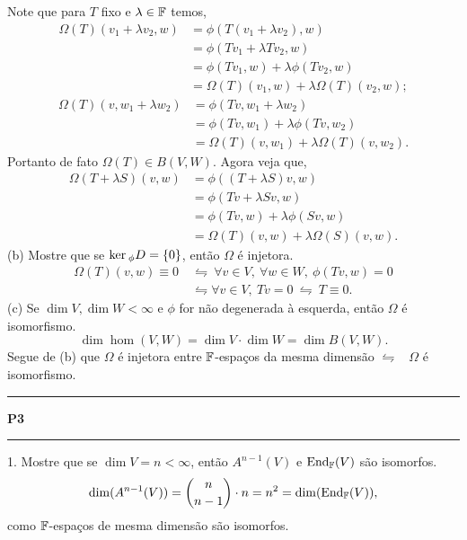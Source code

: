 \textcolor{gris}{Note que para \(T\) fixo e \(\lambda \in \mathbb{F}\) temos, 
\begin{align*}
  \Omega(T)(v_1 + \lambda v_2,w) &= \phi(T(v_1+\lambda v_2), w) \\ 
  &= \phi(Tv_1 + \lambda Tv_2, w )\\ 
  &= \phi(Tv_1, w ) + \lambda\phi(Tv_2, w)\\ 
  &= \Omega(T)(v_1,w) + \lambda \Omega(T)(v_2, w );
\end{align*}
\vspace{-0.8cm}
\begin{align*}
  \Omega(T)(v, w_1 + \lambda w_2) &= \phi(Tv, w_1+\lambda w_2) \\ 
  &= \phi(Tv,w_1) + \lambda \phi(Tv, w_2)\\ 
  &= \Omega(T)(v,w_1) + \lambda \Omega(T)(v, w_2 ).
\end{align*}
Portanto de fato \(\Omega(T) \in B(V,W)\). Agora veja que, 
\begin{align*}
  \Omega(T+ \lambda S)(v,w) &= \phi((T+\lambda S)v, w) \\ 
   &= \phi(Tv+\lambda Sv, w) \\ 
   &= \phi(Tv,w)+\lambda \phi(Sv, w) \\ 
   &= \Omega(T)(v,w)+\lambda \Omega(S)(v, w).  
\end{align*}
}
(b) Mostre que se \(\ker\hspace{0.01cm} _\phi D = \{0\}\), então \(\Omega\) é injetora. 
\textcolor{gris}{
\begin{align*}
  \Omega(T)(v,w) \equiv 0 \ &\leftrightharpoons \ \forall v \in V, \ \forall w \in W, \ \phi(Tv, w) = 0\\ 
  &\leftrightharpoons \forall v\in V, \ Tv = 0 \ \leftrightharpoons \ T\equiv 0. 
\end{align*}
}
(c) Se \(\dim V, \dim W < \infty\) e \(\phi\) for não degenerada à esquerda, então \(\Omega\) é isomorfismo. \\
\textcolor{gris}{
\[\dim \hom(V,W) = \dim V \cdot \dim W = \dim B(V,W).\]  
Segue de (b) que \(\Omega\) é injetora entre \(\mathbb{F}\)-espaços da mesma dimensão \(\leftrightharpoons\) \ \(\Omega\) é isomorfismo.\\ }

  {\hrule \vspace{-0.15cm}
  \centering \textbf{P3} \vspace{0.1cm}
  \hrule}

1. Mostre que se \(\dim V = n < \infty\), então \(A^{n-1}(V)\) e \(\operatorname{End}_{\mathbb{F}}(V)\) são isomorfos. \\ 
\textcolor{gris}{
  \[\dim (A^{n-1}(V)) = \binom{n}{n-1} \cdot n = n^2 = \dim (\operatorname{End}_{\mathbb{F}}(V)),\]
  como \(\mathbb{F}\)-espaços de mesma dimensão são isomorfos.  
}

